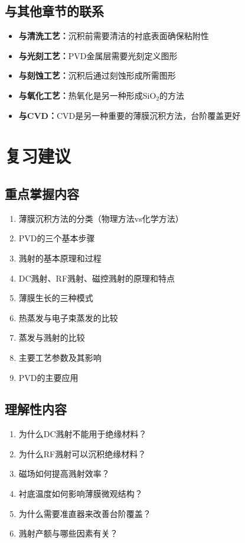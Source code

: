 \documentclass[UTF8,12pt,a4paper]{ctexart}
\begin{document}
\subsection{与其他章节的联系}

\begin{itemize}
    \item \textbf{与清洗工艺：}沉积前需要清洁的衬底表面确保粘附性
    \item \textbf{与光刻工艺：}PVD金属层需要光刻定义图形
    \item \textbf{与刻蚀工艺：}沉积后通过刻蚀形成所需图形
    \item \textbf{与氧化工艺：}热氧化是另一种形成SiO$_2$的方法
    \item \textbf{与CVD：}CVD是另一种重要的薄膜沉积方法，台阶覆盖更好
\end{itemize}

\section{复习建议}

\subsection{重点掌握内容}

\begin{enumerate}
    \item 薄膜沉积方法的分类（物理方法vs化学方法）
    \item PVD的三个基本步骤
    \item 溅射的基本原理和过程
    \item DC溅射、RF溅射、磁控溅射的原理和特点
    \item 薄膜生长的三种模式
    \item 热蒸发与电子束蒸发的比较
    \item 蒸发与溅射的比较
    \item 主要工艺参数及其影响
    \item PVD的主要应用
\end{enumerate}

\subsection{理解性内容}

\begin{enumerate}
    \item 为什么DC溅射不能用于绝缘材料？
    \item 为什么RF溅射可以沉积绝缘材料？
    \item 磁场如何提高溅射效率？
    \item 衬底温度如何影响薄膜微观结构？
    \item 为什么需要准直器来改善台阶覆盖？
    \item 溅射产额与哪些因素有关？
\end{enumerate}
\end{document}
